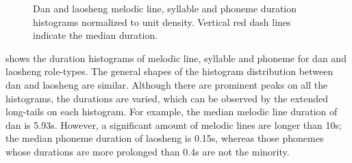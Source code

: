 \begin{figure}[ht!]
    \caption[]{Dan and laosheng melodic line, syllable and phoneme duration histograms normalized to unit density. Vertical red dash lines indicate the median duration.}
    \label{fig:ch4:dan_laosheng_histo}
\end{figure}

 shows the duration histograms of melodic line, syllable and phoneme for dan and laosheng role-types. The general shapes of the histogram distribution between dan and laosheng are similar. Although there are prominent peaks on all the histograms, the durations are varied, which can be observed by the extended long-tails on each histogram. For example, the median melodic line duration of dan is 5.93s. However, a significant amount of melodic lines are longer than 10s; the median phoneme duration of laosheng is 0.15s, whereas those phonemes whose durations are more prolonged than 0.4s are not the minority.

